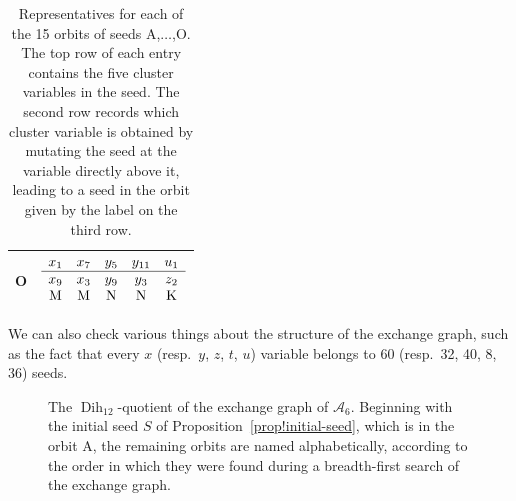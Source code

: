 \documentclass[pdftex]{sigma}
\numberwithin{equation}{section}
\theoremstyle{definition}
\DeclareMathOperator{\Dih}{Dih}
\begin{document}
\begin{table}[th!]
\begin{tabular}{|c|c|}
O & $\begin{array}{ccccc}
x_1&x_7&y_5&y_{11}&u_1 \\ \hline
x_9&x_3&y_9&y_3&z_2 \\
\text M&\text M&\text N&\text N&\text K
\end{array}$ \\ \hline
\end{tabular}
\caption{Representatives for each of the 15 orbits of seeds A,$\ldots$,O. The top row of each entry contains the five cluster variables in the seed. The second row records which cluster variable is obtained by mutating the seed at the variable directly above it, leading to a seed in the orbit given by the label on the third row.}\label{tab!seeds}
\end{table}

We can also check various things about the structure of the exchange graph, such as the fact that every $x$ (resp.\ $y$, $z$, $t$, $u$) variable belongs to 60 (resp.\ 32, 40, 8, 36) seeds.

\begin{figure}[t]
\centering
{}
\caption{The $\Dih_{12}$-quotient of the exchange graph of $\mathcal A_6$. Beginning with the initial seed $S$ of Proposition~\ref{prop!initial-seed}, which is in the orbit A, the remaining orbits are named alphabetically, according to the order in which they were found during a breadth-first search of the exchange graph.}\label{fig!exchange-graph}
\end{figure}
\end{document}
